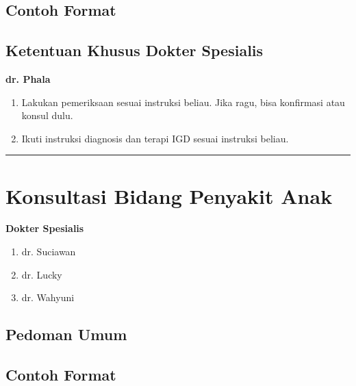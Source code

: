 \documentclass[
]{book}
\providecommand{\tightlist}{%
  \setlength{\itemsep}{0pt}\setlength{\parskip}{0pt}}
\begin{document}
\hypertarget{contoh-format}{%
\subsection{Contoh Format}\label{contoh-format}}

\hypertarget{ketentuan-khusus-dokter-spesialis-1}{%
\subsection{Ketentuan Khusus Dokter Spesialis}\label{ketentuan-khusus-dokter-spesialis-1}}

\textbf{dr. Phala}

\begin{enumerate}
\def\labelenumi{\arabic{enumi}.}
\item
  Lakukan pemeriksaan sesuai instruksi beliau. Jika ragu, bisa konfirmasi atau konsul dulu.
\item
  Ikuti instruksi diagnosis dan terapi IGD sesuai instruksi beliau.
\end{enumerate}

\begin{center}\rule{0.5\linewidth}{0.5pt}\end{center}

\hypertarget{konsultasi-bidang-penyakit-anak}{%
\section{Konsultasi Bidang Penyakit Anak}\label{konsultasi-bidang-penyakit-anak}}

\textbf{Dokter Spesialis}

\begin{enumerate}
\def\labelenumi{\arabic{enumi}.}
\tightlist
\item
  dr. Suciawan
\item
  dr. Lucky
\item
  dr. Wahyuni
\end{enumerate}

\hypertarget{pedoman-umum-1}{%
\subsection{Pedoman Umum}\label{pedoman-umum-1}}

\hypertarget{contoh-format-1}{%
\subsection{Contoh Format}\label{contoh-format-1}}
\end{document}
